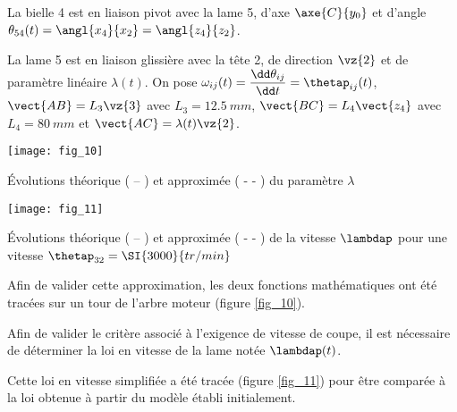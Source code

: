 La bielle 4 est en liaison pivot avec la lame 5, d’axe $\axe{C}{y_0}$ et d’angle $\theta_{54} (t)= \angl{x_4}{x_2} = \angl{z_4}{z_2} $.

La lame 5 est en liaison glissière avec la tête 2, de direction  $\vz{2}$ et de paramètre linéaire $\lambda(t)$.
On pose $\omega_{ij} (t)= \dfrac{\dd \theta_{ij}}{\dd t} = \thetap_{ij}(t)$, $\vect{AB}=L_3\vz{3}$ avec $L_3=\SI{12,5}{mm}$, $\vect{BC}=L_4 \vect{z_4}$  avec $L_4=\SI{80}{mm}$ et $\vect{AC}=\lambda(t)\vz{2}$.

\begin{marginfigure}
\texttt{[image: fig\_10]}
\caption{ Évolutions théorique ( -- ) et approximée ( - - ) du paramètre $\lambda$ \label{fig_10}}
\end{marginfigure}

\begin{marginfigure}
\texttt{[image: fig\_11]}
\caption{ Évolutions théorique ( -- ) et approximée ( - - ) de la vitesse $\lambdap$ pour une vitesse $\thetap_{32}=\SI{3000}{tr/min}$ \label{fig_10}}
\end{marginfigure}




Afin de valider cette approximation, les deux fonctions mathématiques ont été tracées sur un tour de l’arbre moteur (figure \ref{fig_10}).





Afin de valider le critère associé à l’exigence de vitesse de coupe, il est nécessaire de déterminer la loi en vitesse de la lame notée $\lambdap(t)$.


Cette loi en vitesse simplifiée a été tracée (figure \ref{fig_11}) pour être comparée à la loi obtenue à partir du modèle établi initialement.

